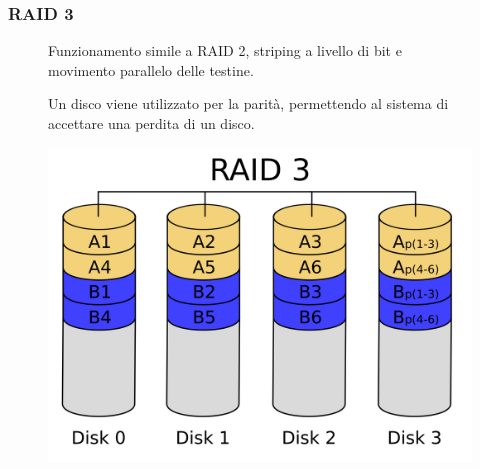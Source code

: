 \subsubsection*{RAID 3}
\begin{figure}[H]
    \centering
    \begin{minipage}{0.65\textwidth}
        Funzionamento simile a RAID 2, striping a livello di bit e movimento parallelo delle testine.

        Un disco viene utilizzato per la parità, permettendo al sistema di accettare una perdita di un disco.
    \end{minipage}
    \hfill
    \begin{minipage}{0.3\textwidth}
        \centering
        \includegraphics[width=1\linewidth]{assets/RAID_3.png}
    \end{minipage}
\end{figure}


